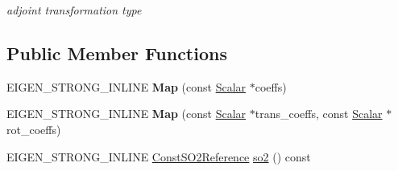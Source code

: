 \begin{DoxyCompactItemize}
\begin{DoxyCompactList}\small\item\em adjoint transformation type \end{DoxyCompactList}\end{DoxyCompactItemize}
\subsection*{Public Member Functions}
\begin{DoxyCompactItemize}
\item 
E\+I\+G\+E\+N\+\_\+\+S\+T\+R\+O\+N\+G\+\_\+\+I\+N\+L\+I\+NE {\bfseries Map} (const \hyperlink{class_eigen_1_1_map_3_01const_01_sophus_1_1_s_e2_group_3_01___scalar_01_4_00_01___options_01_4_a650e0e4b02a9d2374857c53ff39f5649}{Scalar} $\ast$coeffs)\hypertarget{class_eigen_1_1_map_3_01const_01_sophus_1_1_s_e2_group_3_01___scalar_01_4_00_01___options_01_4_a2f1e39f89bd464ffe5d3cf2a57d94993}{}\label{class_eigen_1_1_map_3_01const_01_sophus_1_1_s_e2_group_3_01___scalar_01_4_00_01___options_01_4_a2f1e39f89bd464ffe5d3cf2a57d94993}

\item 
E\+I\+G\+E\+N\+\_\+\+S\+T\+R\+O\+N\+G\+\_\+\+I\+N\+L\+I\+NE {\bfseries Map} (const \hyperlink{class_eigen_1_1_map_3_01const_01_sophus_1_1_s_e2_group_3_01___scalar_01_4_00_01___options_01_4_a650e0e4b02a9d2374857c53ff39f5649}{Scalar} $\ast$trans\+\_\+coeffs, const \hyperlink{class_eigen_1_1_map_3_01const_01_sophus_1_1_s_e2_group_3_01___scalar_01_4_00_01___options_01_4_a650e0e4b02a9d2374857c53ff39f5649}{Scalar} $\ast$rot\+\_\+coeffs)\hypertarget{class_eigen_1_1_map_3_01const_01_sophus_1_1_s_e2_group_3_01___scalar_01_4_00_01___options_01_4_ab0275ba559b39e37052675338fbfdb93}{}\label{class_eigen_1_1_map_3_01const_01_sophus_1_1_s_e2_group_3_01___scalar_01_4_00_01___options_01_4_ab0275ba559b39e37052675338fbfdb93}

\item 
E\+I\+G\+E\+N\+\_\+\+S\+T\+R\+O\+N\+G\+\_\+\+I\+N\+L\+I\+NE \hyperlink{class_eigen_1_1_map_3_01const_01_sophus_1_1_s_e2_group_3_01___scalar_01_4_00_01___options_01_4_a82e98c7b87974f4673520af28fd36576}{Const\+S\+O2\+Reference} \hyperlink{class_eigen_1_1_map_3_01const_01_sophus_1_1_s_e2_group_3_01___scalar_01_4_00_01___options_01_4_a6244c172ef46455ad6e6c5a8d2817b11}{so2} () const \hypertarget{class_eigen_1_1_map_3_01const_01_sophus_1_1_s_e2_group_3_01___scalar_01_4_00_01___options_01_4_a6244c172ef46455ad6e6c5a8d2817b11}{}\label{class_eigen_1_1_map_3_01const_01_sophus_1_1_s_e2_group_3_01___scalar_01_4_00_01___options_01_4_a6244c172ef46455ad6e6c5a8d2817b11}


\end{DoxyCompactItemize}

